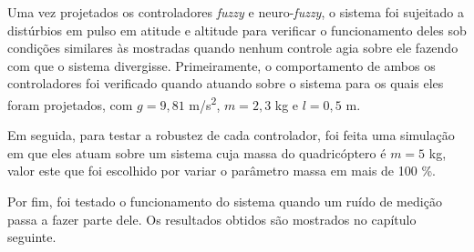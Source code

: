 Uma vez projetados os controladores \textit{fuzzy} e neuro-\textit{fuzzy}, o sistema foi sujeitado a distúrbios em pulso em atitude e altitude para verificar o funcionamento deles sob condições similares às mostradas quando nenhum controle agia sobre ele fazendo com que o sistema divergisse. Primeiramente, o comportamento de ambos os controladores foi verificado quando atuando sobre o sistema para os quais eles foram projetados, com $g=9,81$ m/s\textsuperscript{2}, $m=2,3$ kg e $l=0,5$ m. 

Em seguida, para testar a robustez de cada controlador, foi feita uma simulação em que eles atuam sobre um sistema cuja massa do quadricóptero é $m=5$ kg, valor este que foi escolhido por variar o parâmetro massa em mais de 100 \%.

Por fim, foi testado o funcionamento do sistema quando um ruído de medição passa a fazer parte dele. Os resultados obtidos são mostrados no capítulo seguinte.